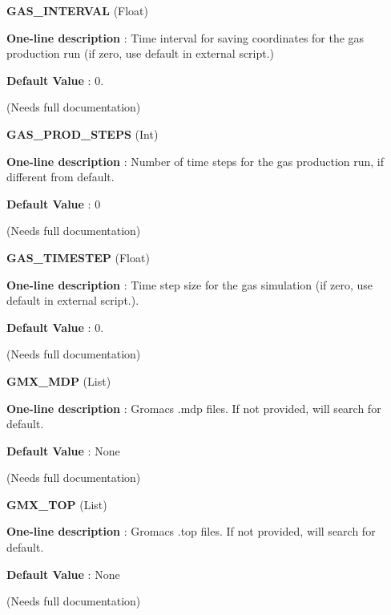 \begin{DoxyItemize}
\item {\bfseries  G\-A\-S\-\_\-\-I\-N\-T\-E\-R\-V\-A\-L } (Float) \par
{\bfseries  One-\/line description }\-: Time interval for saving coordinates for the gas production run (if zero, use default in external script.) \par
{\bfseries  Default Value }\-: 0. \par
(Needs full documentation)\end{DoxyItemize}
\begin{DoxyItemize}
\item {\bfseries  G\-A\-S\-\_\-\-P\-R\-O\-D\-\_\-\-S\-T\-E\-P\-S } (Int) \par
{\bfseries  One-\/line description }\-: Number of time steps for the gas production run, if different from default. \par
{\bfseries  Default Value }\-: 0 \par
(Needs full documentation)\end{DoxyItemize}
\begin{DoxyItemize}
\item {\bfseries  G\-A\-S\-\_\-\-T\-I\-M\-E\-S\-T\-E\-P } (Float) \par
{\bfseries  One-\/line description }\-: Time step size for the gas simulation (if zero, use default in external script.). \par
{\bfseries  Default Value }\-: 0. \par
(Needs full documentation)\end{DoxyItemize}
\begin{DoxyItemize}
\item {\bfseries  G\-M\-X\-\_\-\-M\-D\-P } (List) \par
{\bfseries  One-\/line description }\-: Gromacs .mdp files. If not provided, will search for default. \par
{\bfseries  Default Value }\-: None \par
(Needs full documentation)\end{DoxyItemize}
\begin{DoxyItemize}
\item {\bfseries  G\-M\-X\-\_\-\-T\-O\-P } (List) \par
{\bfseries  One-\/line description }\-: Gromacs .top files. If not provided, will search for default. \par
{\bfseries  Default Value }\-: None \par
(Needs full documentation)\end{DoxyItemize}
